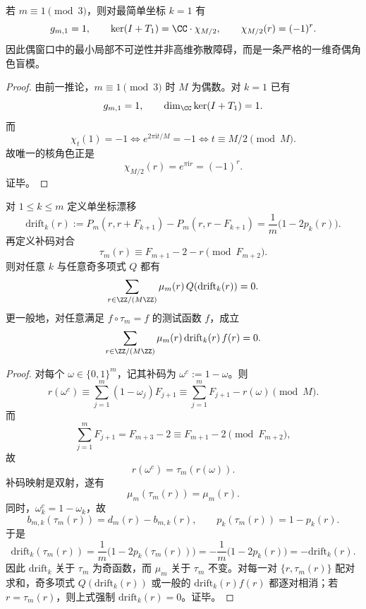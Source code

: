 \begin{corollary}[偶窗口中的普适一维奇偶盲模]\label{cor:conclusion-residue-even-window-universal-parity-blind-mode}
若 \(m\equiv 1\pmod 3\)，则对最简单坐标 \(k=1\) 有
\[
g_{m,1}=1,
\qquad
\ker(I+T_1)=\CC\cdot \chi_{M/2},
\qquad
\chi_{M/2}(r)=(-1)^r.
\]
因此偶窗口中的最小局部不可逆性并非高维弥散障碍，而是一条严格的一维奇偶角色盲模。
\end{corollary}
\begin{proof}
由前一推论，\(m\equiv 1\pmod 3\) 时 \(M\) 为偶数。对 \(k=1\) 已有
\[
g_{m,1}=1,
\qquad
\dim_{\CC}\ker(I+T_1)=1.
\]
而
\[
\chi_t(1)=-1
\iff
e^{2\pi \mathrm{i}t/M}=-1
\iff
t\equiv M/2\pmod M.
\]
故唯一的核角色正是
\[
\chi_{M/2}(r)=e^{\pi \mathrm{i}r}=(-1)^r.
\]
证毕。
\end{proof}

\begin{theorem}[条件漂移的一切奇矩湮灭]\label{thm:conclusion-residue-drift-all-odd-moments-vanish}
对 \(1\le k\le m\) 定义单坐标漂移
\[
\mathrm{drift}_k(r)
:=
P_m(r,r+F_{k+1})-P_m(r,r-F_{k+1})
=
\frac{1}{m}\bigl(1-2p_k(r)\bigr).
\]
再定义补码对合
\[
\tau_m(r)\equiv F_{m+1}-2-r \pmod{F_{m+2}}.
\]
则对任意 \(k\) 与任意奇多项式 \(Q\) 都有
\[
\sum_{r\in\ZZ/(M\ZZ)}\mu_m(r)\,Q(\mathrm{drift}_k(r))=0.
\]
更一般地，对任意满足 \(f\circ\tau_m=f\) 的测试函数 \(f\)，成立
\[
\sum_{r\in\ZZ/(M\ZZ)}\mu_m(r)\,\mathrm{drift}_k(r)\,f(r)=0.
\]
\end{theorem}
\begin{proof}
对每个 \(\omega\in\{0,1\}^m\)，记其补码为 \(\omega^c:=1-\omega\)。则
\[
r(\omega^c)
\equiv
\sum_{j=1}^{m}(1-\omega_j)F_{j+1}
\equiv
\sum_{j=1}^{m}F_{j+1}-r(\omega)
\pmod M.
\]
而
\[
\sum_{j=1}^{m}F_{j+1}=F_{m+3}-2\equiv F_{m+1}-2\pmod{F_{m+2}},
\]
故
\[
r(\omega^c)=\tau_m(r(\omega)).
\]
补码映射是双射，遂有
\[
\mu_m(\tau_m(r))=\mu_m(r).
\]
同时，\(\omega_k^c=1-\omega_k\)，故
\[
b_{m,k}(\tau_m(r))=d_m(r)-b_{m,k}(r),
\qquad
p_k(\tau_m(r))=1-p_k(r).
\]
于是
\[
\mathrm{drift}_k(\tau_m(r))
=
\frac{1}{m}\bigl(1-2p_k(\tau_m(r))\bigr)
=
-\frac{1}{m}\bigl(1-2p_k(r)\bigr)
=
-\mathrm{drift}_k(r).
\]
因此 \(\mathrm{drift}_k\) 关于 \(\tau_m\) 为奇函数，而 \(\mu_m\) 关于 \(\tau_m\) 不变。对每一对 \(\{r,\tau_m(r)\}\) 配对求和，奇多项式 \(Q(\mathrm{drift}_k(r))\) 或一般的 \(\mathrm{drift}_k(r)f(r)\) 都逐对相消；若 \(r=\tau_m(r)\)，则上式强制 \(\mathrm{drift}_k(r)=0\)。证毕。
\end{proof}


